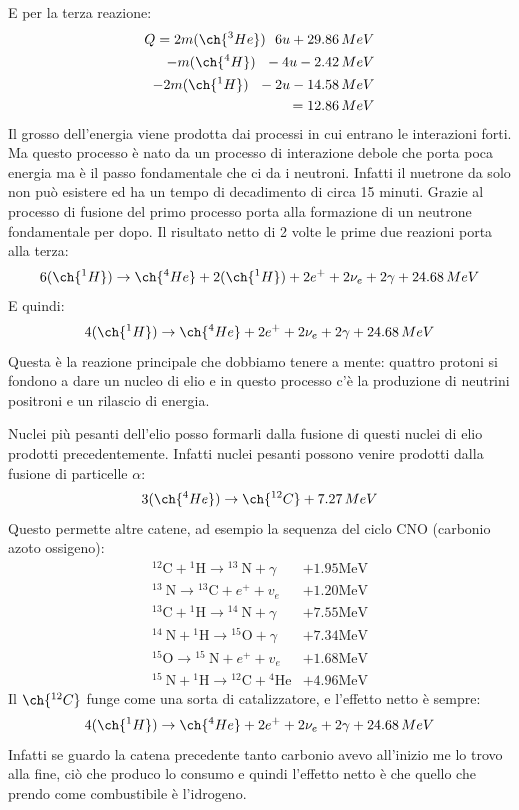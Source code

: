 E per la terza reazione:
\begin{align*}
    Q=2m( \ch{^3He})\,\,\,\,6u+29.86\,MeV \\
    -m( \ch{^4H})\,\,\,\,-4u-2.42\,MeV \\ 
    -2m(\ch{^1H})\,\,\,\,-2u -14.58\,MeV \\
    =12.86\,MeV
\end{align*}
Il grosso dell'energia viene prodotta dai processi in cui entrano le interazioni forti. Ma questo processo è nato da un processo di interazione debole che porta poca energia ma è il passo fondamentale che ci da i neutroni. Infatti il nuetrone da solo non può esistere ed ha un tempo di decadimento di circa 15 minuti. Grazie al processo di fusione del primo processo porta alla formazione di un neutrone fondamentale per dopo. Il risultato netto di 2 volte le prime due reazioni porta alla terza:
\begin{equation*}
    6(\ch{^1H})\to \ch{^4He}+2(\ch{^1H})+2e^++2\nu_e+2\gamma+24.68\,MeV
\end{equation*}
E quindi:
\begin{equation*}
      4(\ch{^1H})\to \ch{^4He}+2e^++2\nu_e+2\gamma+24.68\,MeV
\end{equation*}
Questa è la reazione principale che dobbiamo tenere a mente: quattro protoni si fondono a dare un nucleo di elio e in questo processo c'è la produzione di neutrini positroni e un rilascio di energia. 

Nuclei più pesanti dell'elio posso formarli dalla fusione di questi nuclei di elio prodotti precedentemente. Infatti nuclei pesanti possono venire prodotti dalla fusione di particelle $\alpha$:
\begin{equation*}
    3(\ch{^4He})\to \ch{^{12}C}+7.27\,MeV
\end{equation*}
Questo permette altre catene, ad esempio la sequenza del ciclo CNO (carbonio azoto ossigeno):
\begin{align*}
      ^{12} \mathrm{C}+{ }^1 \mathrm{H} \rightarrow{ }^{13} \mathrm{~N}+\gamma & +1.95 \mathrm{MeV} \\ { }^{13} \mathrm{~N} \rightarrow{ }^{13} \mathrm{C}+e^{+}+v_e & +1.20 \mathrm{MeV} \\ { }^{13} \mathrm{C}+{ }^1 \mathrm{H} \rightarrow{ }^{14} \mathrm{~N}+\gamma & +7.55 \mathrm{MeV} \\ { }^{14} \mathrm{~N}+{ }^1 \mathrm{H} \rightarrow{ }^{15} \mathrm{O}+\gamma & +7.34 \mathrm{MeV} \\ { }^{15} \mathrm{O} \rightarrow{ }^{15} \mathrm{~N}+e^{+}+v_e & +1.68 \mathrm{MeV} \\ { }^{15} \mathrm{~N}+{ }^1 \mathrm{H} \rightarrow{ }^{12} \mathrm{C}+{ }^4 \mathrm{He} & +4.96 \mathrm{MeV}
\end{align*}
Il $\ch{^{12}C}$ funge come una sorta di catalizzatore, e l'effetto netto è sempre:
\begin{equation*}
     4(\ch{^1H})\to \ch{^4He}+2e^++2\nu_e+2\gamma+24.68\,MeV
\end{equation*}
Infatti se guardo la catena precedente tanto carbonio avevo all'inizio me lo trovo alla fine, ciò che produco lo consumo e quindi l'effetto netto è che quello che prendo come combustibile è l'idrogeno.
